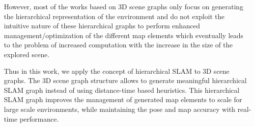 However, most of the works based on 3D scene graphs only focus on generating the hierarchical representation of the environment and do not exploit the intuitive nature of these hierarchical graphs to perform enhanced management/optimization of the different map elements which eventually leads to the problem of increased computation with the increase in the size of the explored scene. 

Thus in this work, we apply the concept of hierarchical SLAM to 3D scene graphs. The 3D scene graph structure allows to generate meaningful hierarchical SLAM graph instead of using distance-time based heuristics. This hierarchical SLAM graph improves the management of generated map elements to scale for large scale environments, while maintaining the pose and map accuracy with real-time performance. 